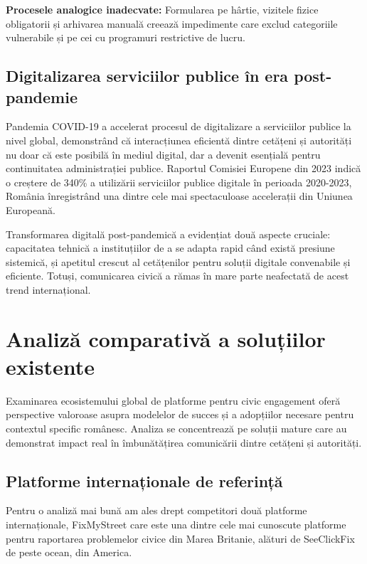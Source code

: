 \documentclass[12pt,a4paper]{report}
\begin{document}
\textbf{Procesele analogice inadecvate:} Formularea pe hârtie, vizitele fizice obligatorii și arhivarea manuală creează impedimente care exclud categoriile vulnerabile și pe cei cu programuri restrictive de lucru.

\subsection{Digitalizarea serviciilor publice în era post-pandemie}

Pandemia COVID-19 a accelerat procesul de digitalizare a serviciilor publice la nivel global, demonstrând că interacțiunea eficientă dintre cetățeni și autorități nu doar că este posibilă în mediul digital, dar a devenit esențială pentru continuitatea administrației publice. Raportul Comisiei Europene din 2023 indică o creștere de 340\% a utilizării serviciilor publice digitale în perioada 2020-2023, România înregistrând una dintre cele mai spectaculoase accelerații din Uniunea Europeană.

Transformarea digitală post-pandemică a evidențiat două aspecte cruciale: capacitatea tehnică a instituțiilor de a se adapta rapid când există presiune sistemică, și apetitul crescut al cetățenilor pentru soluții digitale convenabile și eficiente. Totuși, comunicarea civică a rămas în mare parte neafectată de acest trend internațional.

\section{Analiză comparativă a soluțiilor existente}


Examinarea ecosistemului global de platforme pentru civic engagement oferă perspective valoroase asupra modelelor de succes și a adopțiilor necesare pentru contextul specific românesc. Analiza se concentrează pe soluții mature care au demonstrat impact real în îmbunătățirea comunicării dintre cetățeni și autorități.

\subsection{Platforme internaționale de referință}

Pentru o analiză mai bună am ales drept competitori două platforme internaționale, FixMyStreet care este una dintre cele mai cunoscute platforme pentru raportarea problemelor civice din Marea Britanie, alături de SeeClickFix de peste ocean, din America.
\end{document}
